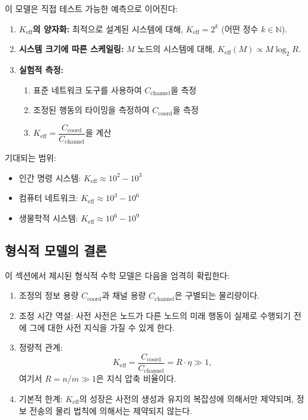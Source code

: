 \documentclass[11pt,a4paper]{article}
\begin{document}
이 모델은 직접 테스트 가능한 예측으로 이어진다:
\begin{enumerate}
	\item \textbf{$K_{\mathrm{eff}}$의 양자화:} 최적으로 설계된 시스템에 대해, $K_{\mathrm{eff}} = 2^k$ (어떤 정수 $k \in \mathbb{N}$).
	
	\item \textbf{시스템 크기에 따른 스케일링:} $M$ 노드의 시스템에 대해, $K_{\mathrm{eff}}(M) \propto M \log_2 R$.
	
	\item \textbf{실험적 측정:} 
	\begin{enumerate}
		\item 표준 네트워크 도구를 사용하여 $C_{\text{channel}}$을 측정
		\item 조정된 행동의 타이밍을 측정하여 $C_{\text{coord}}$을 측정
		\item $K_{\mathrm{eff}} = \dfrac{C_{\text{coord}}}{C_{\text{channel}}}$을 계산
	\end{enumerate}
\end{enumerate}

기대되는 범위:
\begin{itemize}
	\item 인간 명령 시스템: $K_{\mathrm{eff}} \approx 10^2 - 10^3$
	\item 컴퓨터 네트워크: $K_{\mathrm{eff}} \approx 10^3 - 10^6$
	\item 생물학적 시스템: $K_{\mathrm{eff}} \approx 10^6 - 10^9$
\end{itemize}

\subsection{형식적 모델의 결론}

이 섹션에서 제시된 형식적 수학 모델은 다음을 엄격히 확립한다:
\begin{enumerate}
	\item 조정의 정보 용량 $C_{\text{coord}}$과 채널 용량 $C_{\text{channel}}$은 구별되는 물리량이다.
	\item 조정 시간 역설: 사전 사전은 노드가 다른 노드의 미래 행동이 실제로 수행되기 전에 그에 대한 사전 지식을 가질 수 있게 한다.
	\item 정량적 관계:
	\[
	K_{\mathrm{eff}} = \frac{C_{\text{coord}}}{C_{\text{channel}}} = R \cdot \eta \gg 1,
	\]
	여기서 $R = n/m \gg 1$은 지식 압축 비율이다.
	\item 기본적 한계: $K_{\mathrm{eff}}$의 성장은 사전의 생성과 유지의 복잡성에 의해서만 제약되며, 정보 전송의 물리 법칙에 의해서는 제약되지 않는다.
\end{enumerate}
\end{document}
